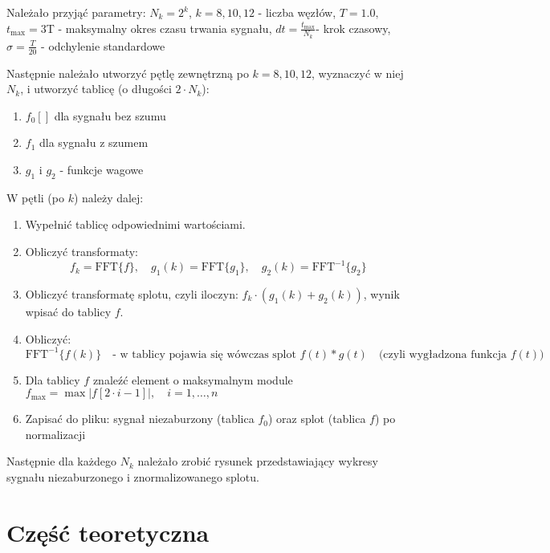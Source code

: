 \documentclass{article}
\begin{document}
\noindent
Należało przyjąć parametry:
\noindent
$N_k = 2^k$, $k = 8, 10, 12$ - liczba węzłów, $T = 1.0,$\\ $t_{\max} = 3$T - maksymalny okres czasu trwania sygnału,
$dt = \frac{t_{\max}}{N_k} $- krok czasowy, $\sigma = \frac{T}{20}$ - odchylenie standardowe


\newpage
\noindent
Następnie należało utworzyć pętlę zewnętrzną po \( k = 8, 10, 12 \), wyznaczyć w niej \( N_k \), i utworzyć tablicę (o długości \( 2 \cdot N_k \)):
\begin{enumerate}
    \item \( f_0[ ] \) dla sygnału bez szumu 
    \item \( f_1 \) dla sygnału z szumem 
    \item \( g_1 \) i \( g_2 \) - funkcje wagowe
\end{enumerate}

\noindent
W pętli (po \( k \)) należy dalej:
\begin{enumerate}
    \item Wypełnić tablicę odpowiednimi wartościami.
    \item Obliczyć transformaty:
    \[
    f_k = \text{FFT}\{f\}, \quad g_1(k) = \text{FFT}\{g_1\}, \quad g_2(k) = \text{FFT}^{-1}\{g_2\}
    \]
    \item Obliczyć transformatę splotu, czyli iloczyn: \( f_k \cdot (g_1(k) + g_2(k)) \), wynik wpisać do tablicy \( f \).
    \item Obliczyć:
    \[
    \text{FFT}^{-1}\{f(k)\} \quad \text{- w tablicy pojawia się wówczas splot } f(t) * g(t) \quad \text{(czyli wygładzona funkcja } f(t) \text{)}
    \]
    \item Dla tablicy \( f \) znaleźć element o maksymalnym module \( f_{\max} = \max\left| f[2 \cdot i - 1] \right|, \quad i = 1, \ldots, n \)
    \item Zapisać do pliku: sygnał niezaburzony (tablica \( f_0 \)) oraz splot (tablica \( f \)) po normalizacji
    
\end{enumerate}

\noindent
Następnie dla każdego \( N_k \) należało zrobić rysunek przedstawiający wykresy sygnału niezaburzonego i znormalizowanego splotu. 



\section{Część teoretyczna}
\end{document}
